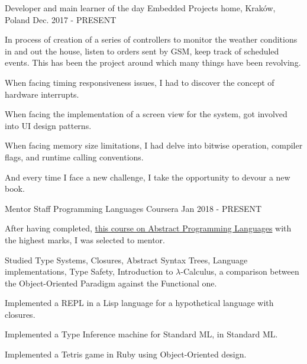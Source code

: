 

\begin{cventries}

\cventry
	{Developer and main learner of the day}
	{Embedded Projects}
	{home, Kraków, Poland}
	{Dec. 2017 - PRESENT}
	{
		\begin{cvitems} %
			\item {In process of creation of a series of controllers to monitor the weather conditions in and out the house, listen to orders sent by GSM, keep track of scheduled events. This has been the project around which many things have been revolving.}
	        \item {When facing timing responsiveness issues, I had to discover the concept of hardware interrupts.}
			\item {When facing the implementation of a screen view for the system, got involved into UI design patterns.}
			\item {When facing memory size limitations, I had delve into bitwise operation, compiler flags, and runtime calling conventions.}
			\item {And every time I face a new challenge, I take the opportunity to devour a new book.}
		\end{cvitems}
	}

  \cventry
    {Mentor Staff}
    {Programming Languages}
    {Coursera}
    {Jan 2018 - PRESENT}
    {
      \begin{cvitems} %
        \item {After having completed, \href{https://www.coursera.org/learn/programming-languages}{this course on Abstract Programming Languages} with the highest marks, I was selected to mentor.}
        \item {Studied Type Systems, Closures, Abstract Syntax Trees, Language implementations, Type Safety, Introduction to $\lambda$-Calculus, a comparison between the Object-Oriented Paradigm against the Functional one.}
        \item {Implemented a REPL in a Lisp language for a hypothetical language with closures.}
        \item {Implemented a Type Inference machine for Standard ML, in Standard ML.}
        \item {Implemented a Tetris game in Ruby using Object-Oriented design.}
      \end{cvitems}
    }


\end{cventries}
